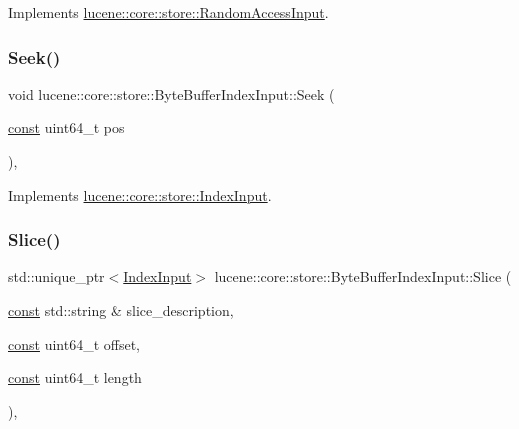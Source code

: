 Implements \mbox{\hyperlink{classlucene_1_1core_1_1store_1_1RandomAccessInput_abb5d56744a927492a2dc0cf0bc8407b3}{lucene\+::core\+::store\+::\+Random\+Access\+Input}}.

\mbox{\label{classlucene_1_1core_1_1store_1_1ByteBufferIndexInput_a738aaa390f9fe7c48006969b857bcc62}} 
\subsubsection{\texorpdfstring{Seek()}{Seek()}}
{\footnotesize\ttfamily void lucene\+::core\+::store\+::\+Byte\+Buffer\+Index\+Input\+::\+Seek (\begin{DoxyParamCaption}\item[{\mbox{\hyperlink{ZlibCrc32_8h_a2c212835823e3c54a8ab6d95c652660e}{const}} uint64\+\_\+t}]{pos }\end{DoxyParamCaption})\hspace{0.3cm}{\ttfamily [inline]}, {\ttfamily [virtual]}}



Implements \mbox{\hyperlink{classlucene_1_1core_1_1store_1_1IndexInput_ad0eecec90fbbcfe46f881d75105a6046}{lucene\+::core\+::store\+::\+Index\+Input}}.

\mbox{\label{classlucene_1_1core_1_1store_1_1ByteBufferIndexInput_acadb7814d29b518a2b165aa29184a9ab}} 
\subsubsection{\texorpdfstring{Slice()}{Slice()}}
{\footnotesize\ttfamily std\+::unique\+\_\+ptr$<$\mbox{\hyperlink{classlucene_1_1core_1_1store_1_1IndexInput}{Index\+Input}}$>$ lucene\+::core\+::store\+::\+Byte\+Buffer\+Index\+Input\+::\+Slice (\begin{DoxyParamCaption}\item[{\mbox{\hyperlink{ZlibCrc32_8h_a2c212835823e3c54a8ab6d95c652660e}{const}} std\+::string \&}]{slice\+\_\+description,  }\item[{\mbox{\hyperlink{ZlibCrc32_8h_a2c212835823e3c54a8ab6d95c652660e}{const}} uint64\+\_\+t}]{offset,  }\item[{\mbox{\hyperlink{ZlibCrc32_8h_a2c212835823e3c54a8ab6d95c652660e}{const}} uint64\+\_\+t}]{length }\end{DoxyParamCaption})\hspace{0.3cm}{\ttfamily [inline]}, {\ttfamily [virtual]}}




